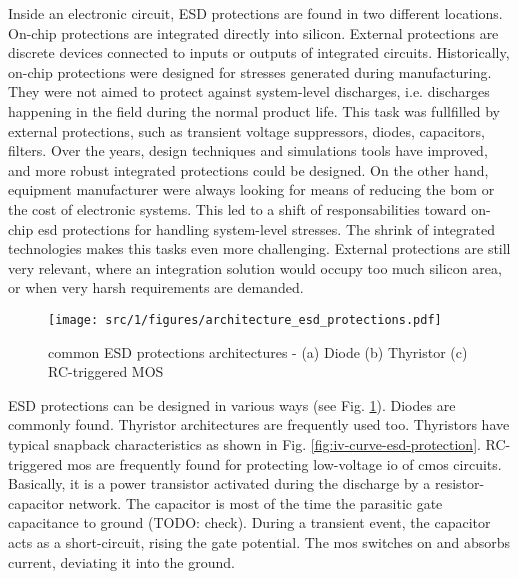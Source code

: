Inside an electronic circuit, ESD protections are found in two different locations.
On-chip protections are integrated directly into silicon.
External protections are discrete devices connected to inputs or outputs of integrated circuits.
Historically, on-chip protections were designed for stresses generated during manufacturing.
They were not aimed to protect against system-level discharges, i.e. discharges happening in the field during the normal product life.
This task was fullfilled by external protections, such as transient voltage suppressors, diodes, capacitors, filters.
Over the years, design techniques and simulations tools have improved, and more robust integrated protections could be designed.
On the other hand, equipment manufacturer were always looking for means of reducing the \gls{bom} or the cost of electronic systems.
This led to a shift of responsabilities toward on-chip \gls{esd} protections for handling system-level stresses.
The shrink of integrated technologies makes this tasks even more challenging.
External protections are still very relevant, where an integration solution would occupy too much silicon area, or when very harsh requirements are demanded.


\begin{figure}[!h]
  \centering
  \texttt{[image: src/1/figures/architecture\_esd\_protections.pdf]}
  \caption{common ESD protections architectures - (a) Diode (b) Thyristor (c) RC-triggered MOS}
  \label{fig:architecture-esd-protection}
\end{figure}

ESD protections can be designed in various ways (see Fig. \ref{fig:architecture-esd-protection}).
Diodes are commonly found.
Thyristor architectures are frequently used too.
Thyristors have typical snapback characteristics as shown in Fig. \ref{fig:iv-curve-esd-protection}.
RC-triggered \gls{mos} are frequently found for protecting low-voltage \gls{io} of \gls{cmos} circuits.
Basically, it is a power transistor activated during the discharge by a resistor-capacitor network.
The capacitor is most of the time the parasitic gate capacitance to ground (TODO: check).
During a transient event, the capacitor acts as a short-circuit, rising the gate potential.
The \gls{mos} switches on and absorbs current, deviating it into the ground.

